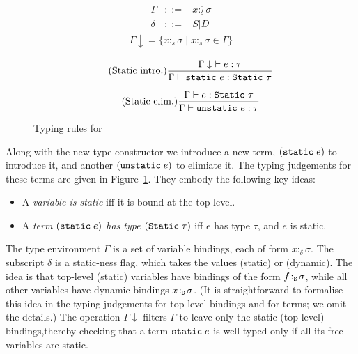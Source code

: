 \documentclass[preprint]{sigplanconf}
\begin{document}
\begin{figure}
\begin{minipage}{\linewidth}
$$
\begin{array}{rcl}
\Gamma & ::= & \overline{x :_{\delta} \sigma} \\
     \delta & ::= & S | D
\end{array}
$$
\begin{align*}
\Gamma\downarrow = \{ x:_{s} \sigma \mid x :_{s} \sigma \in \Gamma \}
\end{align*}

\begin{equation*}
\tag{Static~intro.}
\frac{\Gamma\downarrow~\vdash e : \tau}
     {\Gamma \vdash \text{\tt static}~e : \text{\tt Static}~\tau}
\end{equation*}

\begin{equation*}
\tag{Static~elim.}
\frac{\Gamma \vdash e : \text{\tt Static}~\tau}
     {\Gamma \vdash \text{\tt unstatic}~e : \tau}
\end{equation*}
\end{minipage}
\caption{Typing rules for } \label{fig:static}
\end{figure}
Along with the new type constructor we introduce a new term,
$(\text{\tt static}\;e)$ to introduce it, and another 
$(\text{\tt unstatic}\;e)$ to elimiate it.
The typing judgements for these terms are given in Figure~\ref{fig:static}.
They embody the following key ideas:
\begin{itemize}
\item A \emph{variable is static} iff it is bound at the top level.
\item A \emph{term $(\text{\tt static}\;e)$ has type $(\text{\tt Static}\;\tau)$} iff 
$e$ has type $\tau$, and $e$ is static.  
\end{itemize}
The type environment $\Gamma$ is a set of variable bindings, each of form $x :_{\delta} \sigma$.
The subscript $\delta$ is a static-ness flag, which takes the values  (static) or
 (dynamic).  The idea is that top-level (static) variables have bindings
of the form $f\! :_{\text{\tt S}}\! \sigma$, while all other variables have dynamic bindings 
$x\! :_{\text{\tt D}}\!\sigma$.
(It is straightforward to formalise this idea in the typing judgements for top-level
bindings and for terms; we omit the details.)
The operation $\Gamma \downarrow$ filters $\Gamma$ to leave only the
static (top-level) bindings,thereby checking that a term $\text{\tt
static}\;e$ is well typed only if all its free variables are static.
\end{document}
